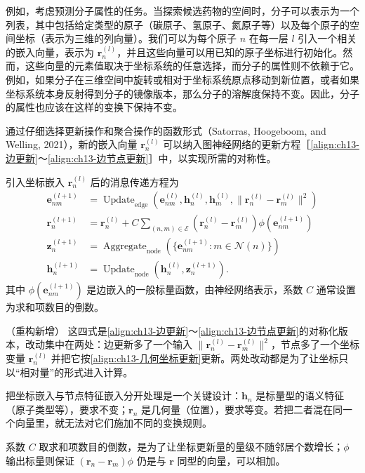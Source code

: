 \documentclass[../../main.tex]{subfiles}
\begin{document}
例如，考虑预测分子属性的任务。当探索候选药物的空间时，分子可以表示为一个列表，其中包括给定类型的原子（碳原子、氢原子、氮原子等）以及每个原子的空间坐标（表示为三维的列向量）。我们可以为每个原子 $n$ 在每一层 $l$ 引入一个相关的嵌入向量，表示为 $\bm{r}_n^{(l)}$，并且这些向量可以用已知的原子坐标进行初始化。然而，这些向量的元素值取决于坐标系统的任意选择，而分子的属性则不依赖于它。例如，如果分子在三维空间中旋转或相对于坐标系统原点移动到新位置，或者如果坐标系统本身反射得到分子的镜像版本，那么分子的溶解度保持不变。因此，分子的属性也应该在这样的变换下保持不变。

通过仔细选择更新操作和聚合操作的函数形式（Satorras, Hoogeboom, and Welling, 2021），新的嵌入向量 $\bm{r}_n^{(l)}$ 可以纳入图神经网络的更新方程［\eqref{align:ch13-边更新}～\eqref{align:ch13-边节点更新}］中，以实现所需的对称性。

\begin{definition}[等变消息传递]\label{definition:ch13-等变消息传递}
引入坐标嵌入 $\bm{r}_n^{(l)}$ 后的消息传递方程为
\begin{align}
\bm{e}_{nm}^{(l+1)}&=\operatorname{Update}_{\mathrm{edge}}\!\left(\bm{e}_{nm}^{(l)},\bm{h}_n^{(l)},\bm{h}_m^{(l)},\|\bm{r}_n^{(l)}-\bm{r}_m^{(l)}\|^2\right)
\label{align:ch13-几何边更新}\\
\bm{r}_n^{(l+1)}&=\bm{r}_n^{(l)}+C\sum_{(n,m)\in\mathcal{E}}\!\left(\bm{r}_n^{(l)}-\bm{r}_m^{(l)}\right)\phi\!\left(\bm{e}_{nm}^{(l+1)}\right)
\label{align:ch13-几何坐标更新}\\
\bm{z}_n^{(l+1)}&=\operatorname{Aggregate}_{\mathrm{node}}\!\left(\{\bm{e}_{nm}^{(l+1)}:m\in\mathcal{N}(n)\}\right)
\label{align:ch13-几何聚合}\\
\bm{h}_n^{(l+1)}&=\operatorname{Update}_{\mathrm{node}}\!\left(\bm{h}_n^{(l)},\bm{z}_n^{(l+1)}\right).
\label{align:ch13-几何节点更新}
\end{align}
其中 $\phi(\bm{e}_{nm}^{(l+1)})$ 是边嵌入的一般标量函数，由神经网络表示，系数 $C$ 通常设置为求和项数目的倒数。
\end{definition}

\begin{remark}（重构新增）
这四式是\eqref{align:ch13-边更新}～\eqref{align:ch13-边节点更新}的对称化版本，改动集中在两处：边更新多了一个输入 $\|\bm{r}_n^{(l)}-\bm{r}_m^{(l)}\|^2$，节点多了一个坐标变量 $\bm{r}_n^{(l)}$ 并把它按\eqref{align:ch13-几何坐标更新}更新。两处改动都是为了让坐标只以“相对量”的形式进入计算。\par
把坐标嵌入与节点特征嵌入分开处理是一个关键设计：$\bm{h}_n$ 是标量型的语义特征（原子类型等），要求不变；$\bm{r}_n$ 是几何量（位置），要求等变。若把二者混在同一个向量里，就无法对它们施加不同的变换规则。\par
系数 $C$ 取求和项数目的倒数，是为了让坐标更新量的量级不随邻居个数增长；$\phi$ 输出标量则保证 $(\bm{r}_n-\bm{r}_m)\phi$ 仍是与 $\bm{r}$ 同型的向量，可以相加。
\end{remark}
\end{document}
